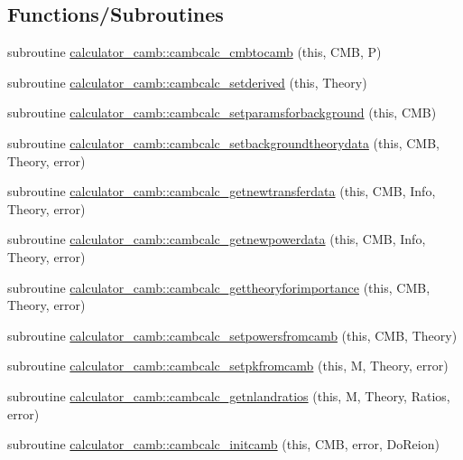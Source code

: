 \subsection*{Functions/\+Subroutines}
\begin{DoxyCompactItemize}
\item 
subroutine \mbox{\hyperlink{namespacecalculator__camb_a10914a67c9b3a93d74382c9c9adf0983}{calculator\+\_\+camb\+::cambcalc\+\_\+cmbtocamb}} (this, C\+MB, P)
\item 
subroutine \mbox{\hyperlink{namespacecalculator__camb_a451eeaadb06191ee0203caf0d76c66c2}{calculator\+\_\+camb\+::cambcalc\+\_\+setderived}} (this, Theory)
\item 
subroutine \mbox{\hyperlink{namespacecalculator__camb_a2f68d8cedf36c519d822547aa49c3f98}{calculator\+\_\+camb\+::cambcalc\+\_\+setparamsforbackground}} (this, C\+MB)
\item 
subroutine \mbox{\hyperlink{namespacecalculator__camb_a04c53e5b4763297e232978e627153a17}{calculator\+\_\+camb\+::cambcalc\+\_\+setbackgroundtheorydata}} (this, C\+MB, Theory, error)
\item 
subroutine \mbox{\hyperlink{namespacecalculator__camb_a9e8887a3ae9da2bb092aac4285234df4}{calculator\+\_\+camb\+::cambcalc\+\_\+getnewtransferdata}} (this, C\+MB, Info, Theory, error)
\item 
subroutine \mbox{\hyperlink{namespacecalculator__camb_ad7195d220a7f5bc77479225b47d91d17}{calculator\+\_\+camb\+::cambcalc\+\_\+getnewpowerdata}} (this, C\+MB, Info, Theory, error)
\item 
subroutine \mbox{\hyperlink{namespacecalculator__camb_a46bd33ed008e289fb5cb08f6feb86419}{calculator\+\_\+camb\+::cambcalc\+\_\+gettheoryforimportance}} (this, C\+MB, Theory, error)
\item 
subroutine \mbox{\hyperlink{namespacecalculator__camb_a7ccabec132f8bbe50ac91abdd4a86751}{calculator\+\_\+camb\+::cambcalc\+\_\+setpowersfromcamb}} (this, C\+MB, Theory)
\item 
subroutine \mbox{\hyperlink{namespacecalculator__camb_a8e6f706ddb3ae930a9f1293d9c480405}{calculator\+\_\+camb\+::cambcalc\+\_\+setpkfromcamb}} (this, M, Theory, error)
\item 
subroutine \mbox{\hyperlink{namespacecalculator__camb_ac0ce3e4748dd96f033235b9dbf3a71b3}{calculator\+\_\+camb\+::cambcalc\+\_\+getnlandratios}} (this, M, Theory, Ratios, error)
\item 
subroutine \mbox{\hyperlink{namespacecalculator__camb_ab67fcdadb23a73d5747a682c87304c0b}{calculator\+\_\+camb\+::cambcalc\+\_\+initcamb}} (this, C\+MB, error, Do\+Reion)

\end{DoxyCompactItemize}

